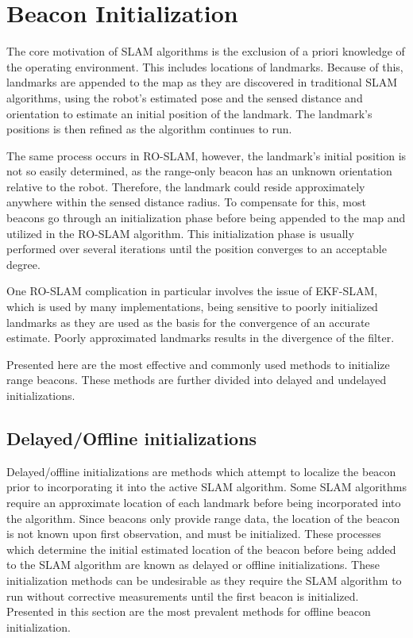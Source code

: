 \documentclass[conference]{IEEEtran}
\begin{document}
			

	\section{Beacon Initialization}
		\label{beacon initialization}
		The core motivation of SLAM algorithms is the exclusion of a priori knowledge of the operating environment. This includes locations of landmarks. Because of this, landmarks are appended to the map as they are discovered in traditional SLAM algorithms, using the robot's estimated pose and the sensed distance and orientation to estimate an initial position of the landmark. The landmark's positions is then refined as the algorithm continues to run.
		
		The same process occurs in RO-SLAM, however, the landmark's initial position is not so easily determined, as the range-only beacon has an unknown orientation relative to the robot. Therefore, the landmark could reside approximately anywhere within the sensed distance radius. To compensate for this, most beacons go through an initialization phase before being appended to the map and utilized in the RO-SLAM algorithm. This initialization phase is usually performed over several iterations until the position converges to an acceptable degree.
		
		One RO-SLAM complication in particular involves the issue of EKF-SLAM, which is used by many implementations, being  sensitive to poorly initialized landmarks as they are used as the basis for the convergence of an accurate estimate. Poorly approximated landmarks results in the divergence of the filter. 
		
		Presented here are the most effective and commonly used methods to initialize range beacons. These methods are further divided into delayed and undelayed initializations.
		
		\subsection{Delayed/Offline initializations}
			Delayed/offline initializations are methods which attempt to localize the beacon prior to incorporating it into the active SLAM algorithm. Some SLAM algorithms require an approximate location of each landmark before being incorporated into the algorithm. Since beacons only provide range data, the location of the beacon is not known upon first observation, and must be initialized. These processes which determine the initial estimated location of the beacon before being added to the SLAM algorithm are known as delayed or offline initializations. These initialization methods can be undesirable as they require the SLAM algorithm to run without corrective measurements until the first beacon is initialized. Presented in this section are the most prevalent methods for offline beacon initialization.
			 
\end{document}
